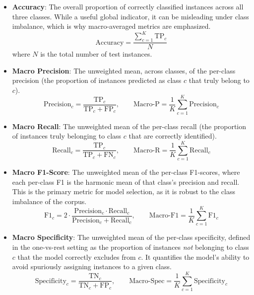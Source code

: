 \documentclass[informatics,article,submit,pdftex,moreauthors]{Definitions/mdpi}
\begin{document}
\begin{itemize}
    \item \textbf{Accuracy}: The overall proportion of correctly classified instances across all three classes. While a useful global indicator, it can be misleading under class imbalance, which is why macro-averaged metrics are emphasized.
    \begin{equation}
        \text{Accuracy} = \frac{\sum_{c=1}^{K}\text{TP}_c}{N}
    \end{equation}
    where $N$ is the total number of test instances.
    \item \textbf{Macro Precision}: The unweighted mean, across classes, of the per-class precision (the proportion of instances predicted as class $c$ that truly belong to $c$).
    \begin{equation}
        \text{Precision}_c = \frac{\text{TP}_c}{\text{TP}_c + \text{FP}_c}, \qquad
        \text{Macro-P} = \frac{1}{K}\sum_{c=1}^{K}\text{Precision}_c
    \end{equation}
    \item \textbf{Macro Recall}: The unweighted mean of the per-class recall (the proportion of instances truly belonging to class $c$ that are correctly identified).
    \begin{equation}
        \text{Recall}_c = \frac{\text{TP}_c}{\text{TP}_c + \text{FN}_c}, \qquad
        \text{Macro-R} = \frac{1}{K}\sum_{c=1}^{K}\text{Recall}_c
    \end{equation}
    \item \textbf{Macro F1-Score}: The unweighted mean of the per-class F1-scores, where each per-class F1 is the harmonic mean of that class's precision and recall. This is the primary metric for model selection, as it is robust to the class imbalance of the corpus.
    \begin{equation}
        \text{F1}_c = 2 \cdot \frac{\text{Precision}_c \cdot \text{Recall}_c}{\text{Precision}_c + \text{Recall}_c}, \qquad
        \text{Macro-F1} = \frac{1}{K}\sum_{c=1}^{K}\text{F1}_c
    \end{equation}
    \item \textbf{Macro Specificity}: The unweighted mean of the per-class specificity, defined in the one-vs-rest setting as the proportion of instances \emph{not} belonging to class $c$ that the model correctly excludes from $c$. It quantifies the model's ability to avoid spuriously assigning instances to a given class.
    \begin{equation}
        \text{Specificity}_c = \frac{\text{TN}_c}{\text{TN}_c + \text{FP}_c}, \qquad
        \text{Macro-Spec} = \frac{1}{K}\sum_{c=1}^{K}\text{Specificity}_c
    \end{equation}
\end{itemize}
\end{document}
